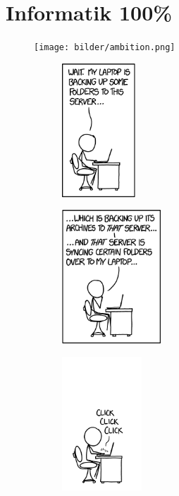 \section{Informatik 100\%}

\begin{figure}[b]
\centering
\texttt{[image: bilder/ambition.png]}
\end{figure}

\begin{figure}[th]
\centering
    \begin{subfigure}{.23\textwidth}
	    \includegraphics[height=5cm]{bilder/backing_up_1.png}
    \end{subfigure}
    \begin{subfigure}{.23\textwidth}
	    \includegraphics[height=5cm]{bilder/backing_up_2.png}
    \end{subfigure}
    \begin{subfigure}{.23\textwidth}
	    \includegraphics[height=5cm]{bilder/backing_up_3.png}
    \end{subfigure}

\end{figure}
